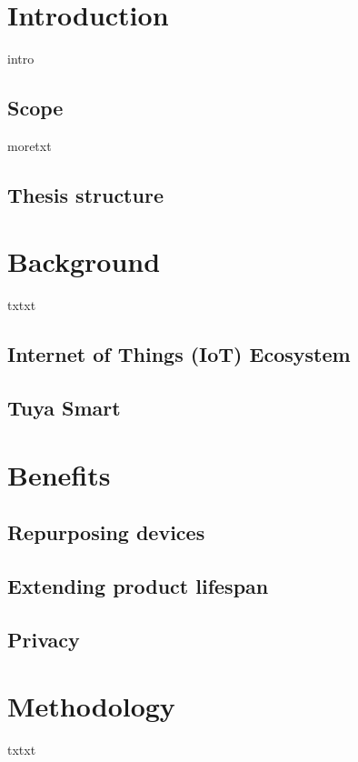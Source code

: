 \documentclass[12pt, a4paper]{scrreprt}
\begin{document}
\maketitle

\thispagestyle{toc}
\tableofcontents
\newpage
{}
\chapter{Introduction}
intro \cite{latex2e}

\section{Scope}
moretxt
\section{}
\section{Thesis structure}

\newpage
\chapter{Background}
txtxt

\section{Internet of Things (IoT) Ecosystem}
\section{Tuya Smart}

\chapter{Benefits}
\section{Repurposing devices}
\section{Extending product lifespan}
\section{Privacy}

\newpage
\chapter{Methodology}
txtxt
\end{document}

